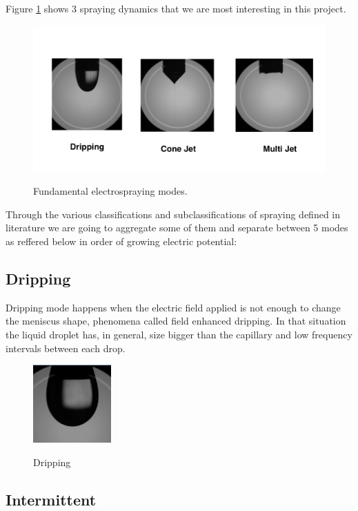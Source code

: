Figure \ref{fig:spraying_modes} shows 3 spraying dynamics that we are most interesting in this project. 


  \begin{figure}[H]
      \center
      \includegraphics[width=15cm]{Figuras/spraying_modes.png}
      \label{fig:spraying_modes}
      \caption{Fundamental electrospraying modes.}
  \end{figure}


Through the various classifications and subclassifications of spraying defined in literature we are going to aggregate some of them and separate between 5 modes as reffered below in order of growing electric potential:

\subsection{Dripping}
\label{subsec:dripping}

Dripping mode happens when the electric field applied is not enough to change the meniscus shape, phenomena called field enhanced dripping.
In that situation the liquid droplet has, in general, size bigger than the capillary and low frequency intervals between each drop.

\begin{figure}[H]
  \center
  \includegraphics[width=3cm]{Figuras/19:03/drip_example.png}
  \label{fig:drip_example}
  \caption{Dripping}
\end{figure}

\subsection{Intermittent}
\label{subsec:Intermittent}

